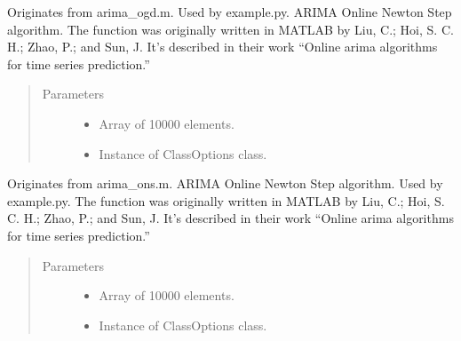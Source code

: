 \documentclass[letterpaper,10pt,english]{sphinxmanual}
\begin{document}
\begin{fulllineitems}
\label{\detokenize{LDS:LDS.OnlineLDS_library.arima_ogd}}
\sphinxAtStartPar
Originates from arima\_ogd.m.
Used by example.py. ARIMA Online Newton Step algorithm.
The function was originally written in MATLAB by Liu, C.; Hoi, S. C. H.; Zhao, P.; and Sun, J.
It’s described in their work “Online arima algorithms for time series prediction.”
\begin{quote}\begin{description}
\item[{Parameters}] \leavevmode\begin{itemize}
\item {} 
\sphinxAtStartPar
{} \textendash{} Array of 10000 elements.

\item {} 
\sphinxAtStartPar
{} \textendash{} Instance of ClassOptions class.

\end{itemize}

\end{description}\end{quote}

\end{fulllineitems}


\begin{fulllineitems}
\label{\detokenize{LDS:LDS.OnlineLDS_library.arima_ons}}
\sphinxAtStartPar
Originates from arima\_ons.m. ARIMA Online Newton Step algorithm.
Used by example.py.
The function was originally written in MATLAB by Liu, C.; Hoi, S. C. H.; Zhao, P.; and Sun, J.
It’s described in their work “Online arima algorithms for time series prediction.”
\begin{quote}\begin{description}
\item[{Parameters}] \leavevmode\begin{itemize}
\item {} 
\sphinxAtStartPar
{} \textendash{} Array of 10000 elements.

\item {} 
\sphinxAtStartPar
{} \textendash{} Instance of ClassOptions class.

\end{itemize}

\end{description}\end{quote}

\end{fulllineitems}
\end{document}
